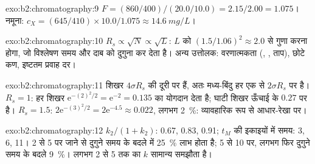 \begin{solution}{exo:b2:chromatography:9}
$F = (860/400)/(20.0/10.0) = 2.15/2.00 = 1.075$। नमूना: $c_X = (645/410) \times 10.0/1.075 \approx
\qty{14.6}{mg/L}$।
\end{solution}

\begin{solution}{exo:b2:chromatography:10}
$R_s \propto \sqrt N \propto \sqrt L$: $L$ को $(1.5/1.06)^2 \approx 2.0$ से गुणा करना होगा, जो विश्लेषण समय
और दाब को दुगुना कर देता है। अन्य उत्तोलक: वरणात्मकता (, ,
ताप), छोटे कण, इष्टतम प्रवाह दर।
\end{solution}

\begin{solution}{exo:b2:chromatography:11}
शिखर $4\sigma R_s$ की दूरी पर हैं, अतः मध्य-बिंदु हर एक से $2\sigma R_s$ पर है। $R_s = 1$: हर शिखर
$\mathrm e^{-(2)^2/2} = \mathrm e^{-2} = 0.135$ का योगदान देता है; घाटी शिखर ऊँचाई के $0.27$ पर है।
$R_s = 1.5$: $2\mathrm e^{-(3)^2/2} = 2\mathrm e^{-4.5} \approx 0.022$, लगभग 2~\%: व्यावहारिक रूप से
आधार-रेखा पर।
\end{solution}

\begin{solution}{exo:b2:chromatography:12}
$k_2/(1+k_2)$: 0.67, 0.83, 0.91; $t_M$ की इकाइयों में समय: 3, 6, 11। 2 से 5 पर जाने से दुगुने समय के बदले
 में 25~\% लाभ होता है; 5 से 10 पर, लगभग फिर दुगुने समय के बदले 9~\%। लगभग 2 से 5 तक का $k$
सामान्य समझौता है।
\end{solution}

